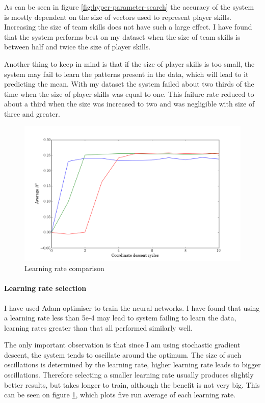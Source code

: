 \documentclass[12pt,a4paper]{book}
\begin{document}
As can be seen in figure \ref{fig:hyper-parameter-search} the accuracy of the system is mostly dependent on the size of vectors used to represent player skills.
Increasing the size of team skills does not have such a large effect.
I have found that the system performs best on my dataset when the size of team skills is between half and twice the size of player skills.

Another thing to keep in mind is that if the size of player skills is too small, the system may fail to learn the patterns present in the data, which will lead to it predicting the mean.
With my dataset the system failed about two thirds of the time when the size of player skills was equal to one.
This failure rate reduced to about a third when the size was increased to two and was negligible with size of three and greater.

\begin{figure}[ht]
\centering
\includegraphics[scale=0.5]{learning-rate}
\caption{Learning rate comparison}
\label{fig:learning-rate}
\end{figure}
\paragraph{Learning rate selection}
I have used Adam optimiser to train the neural networks.
I have found that using a learning rate less than 5e-4 may lead to system failing to learn the data, learning rates greater than that all performed similarly well.

The only important observation is that since I am using stochastic gradient descent, the system tends to oscillate around the optimum.
The size of such oscillations is determined by the learning rate, higher learning rate leads to bigger oscillations.
Therefore selecting a smaller learning rate usually produces slightly better results, but takes longer to train, although the benefit is not very big.
This can be seen on figure \ref{fig:learning-rate}, which plots five run average of each learning rate.
\end{document}
